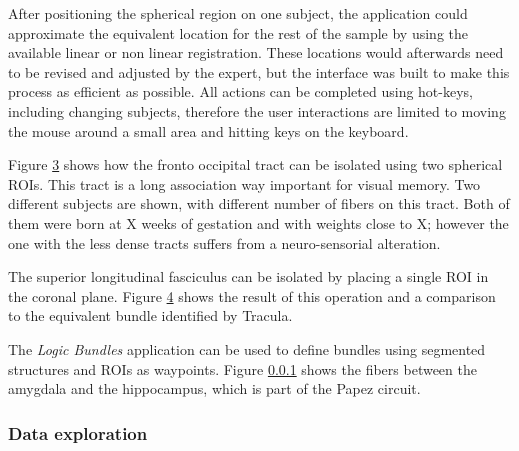 \begin{figure}
\label{fig_thalamus_seed}
\end{figure}



\begin{figure}
\label{fig_thalamus_fibers}
\end{figure}

After positioning the spherical region on one subject, the application could approximate the equivalent location for the rest of the sample by using the available linear or non linear registration. These locations would afterwards need to be revised and adjusted by the expert, but the interface was built to make this process as efficient as possible. All actions can be completed using hot-keys, including changing subjects, therefore the user interactions are limited to moving the mouse around a small area and hitting keys on the keyboard.

Figure \ref{fig_fronto_occipital} shows how the fronto occipital tract can be isolated using two spherical ROIs. This tract is a long association way  important for visual memory. Two different subjects are shown, with different number of fibers on this tract. Both of them were born at X weeks of gestation and with weights close to X; however the one with the less dense tracts suffers from a neuro-sensorial alteration.

\begin{figure}
\label{fig_fronto_occipital}
\end{figure}

The superior longitudinal fasciculus can be isolated by placing a single ROI in the coronal plane. Figure \ref{fig_long_fasc} shows the result of this operation and a comparison to the equivalent bundle identified by Tracula. 

\begin{figure}
\label{fig_long_fasc}
\end{figure}

The \emph{Logic Bundles} application can be used to define bundles using segmented structures and ROIs as waypoints. Figure \ref{} shows the fibers between the amygdala and the hippocampus, which is part of the Papez circuit. 


\begin{figure}
\label{fig_papez}
\end{figure} 



\subsubsection{Data exploration}

